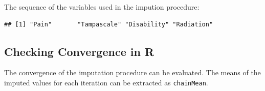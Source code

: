 \documentclass[]{book}
\newenvironment{Shaded}{\begin{snugshade}}{\end{snugshade}}
\newcommand{\OperatorTok}[1]{\textcolor[rgb]{0.81,0.36,0.00}{\textbf{#1}}}
\newcommand{\NormalTok}[1]{#1}
\begin{document}
The sequence of the variables used in the impution procedure:

\begin{Shaded}
\end{Shaded}

\begin{verbatim}
## [1] "Pain"       "Tampascale" "Disability" "Radiation"
\end{verbatim}

\subsection{Checking Convergence in R}\label{checking-convergence-in-r}

The convergence of the imputation procedure can be evaluated. The means
of the imputed values for each iteration can be extracted as
\texttt{chainMean}.

\begin{Shaded}
\end{Shaded}
\end{document}
